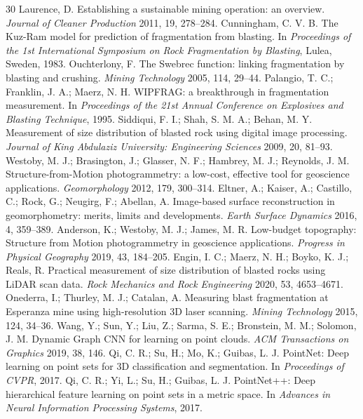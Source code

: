 \documentclass[11pt]{article}
\begin{document}
\FloatBarrier

\begin{thebibliography}{30}
 Laurence, D. Establishing a sustainable mining operation: an overview. \emph{Journal of Cleaner Production} 2011, 19, 278--284.
 Cunningham, C. V. B. The Kuz-Ram model for prediction of fragmentation from blasting. In \emph{Proceedings of the 1st International Symposium on Rock Fragmentation by Blasting}, Lulea, Sweden, 1983.
 Ouchterlony, F. The Swebrec function: linking fragmentation by blasting and crushing. \emph{Mining Technology} 2005, 114, 29--44.
 Palangio, T. C.; Franklin, J. A.; Maerz, N. H. WIPFRAG: a breakthrough in fragmentation measurement. In \emph{Proceedings of the 21st Annual Conference on Explosives and Blasting Technique}, 1995.
 Siddiqui, F. I.; Shah, S. M. A.; Behan, M. Y. Measurement of size distribution of blasted rock using digital image processing. \emph{Journal of King Abdulaziz University: Engineering Sciences} 2009, 20, 81--93.
 Westoby, M. J.; Brasington, J.; Glasser, N. F.; Hambrey, M. J.; Reynolds, J. M. Structure-from-Motion photogrammetry: a low-cost, effective tool for geoscience applications. \emph{Geomorphology} 2012, 179, 300--314.
 Eltner, A.; Kaiser, A.; Castillo, C.; Rock, G.; Neugirg, F.; Abellan, A. Image-based surface reconstruction in geomorphometry: merits, limits and developments. \emph{Earth Surface Dynamics} 2016, 4, 359--389.
 Anderson, K.; Westoby, M. J.; James, M. R. Low-budget topography: Structure from Motion photogrammetry in geoscience applications. \emph{Progress in Physical Geography} 2019, 43, 184--205.
 Engin, I. C.; Maerz, N. H.; Boyko, K. J.; Reals, R. Practical measurement of size distribution of blasted rocks using LiDAR scan data. \emph{Rock Mechanics and Rock Engineering} 2020, 53, 4653--4671.
 Onederra, I.; Thurley, M. J.; Catalan, A. Measuring blast fragmentation at Esperanza mine using high-resolution 3D laser scanning. \emph{Mining Technology} 2015, 124, 34--36.
 Wang, Y.; Sun, Y.; Liu, Z.; Sarma, S. E.; Bronstein, M. M.; Solomon, J. M. Dynamic Graph CNN for learning on point clouds. \emph{ACM Transactions on Graphics} 2019, 38, 146.
 Qi, C. R.; Su, H.; Mo, K.; Guibas, L. J. PointNet: Deep learning on point sets for 3D classification and segmentation. In \emph{Proceedings of CVPR}, 2017.
 Qi, C. R.; Yi, L.; Su, H.; Guibas, L. J. PointNet++: Deep hierarchical feature learning on point sets in a metric space. In \emph{Advances in Neural Information Processing Systems}, 2017.

\end{thebibliography}
\end{document}
